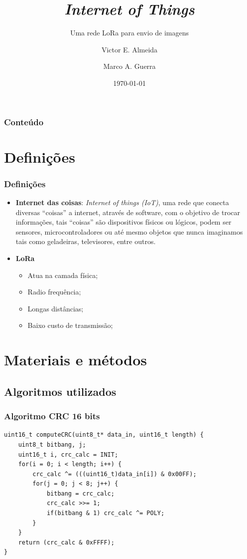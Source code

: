 \documentclass[12pt]{beamer}
\author{Victor E. Almeida \and Marco A. Guerra}
\title{\textit{Internet of Things}}
\subtitle{Uma rede LoRa para envio de imagens}
\date{\today}
\institute{UNIOESTE}
\begin{document}
\frame{\titlepage}

\begin{frame}
\frametitle{Conteúdo}
\tableofcontents
\end{frame}

\section{Definições}
\begin{frame}[allowframebreaks]
    \frametitle{Definições}
    \begin{itemize}
        \item\textbf{Internet das coisas}: \textit{Internet of things (IoT)}, uma rede que conecta
		diversas ``coisas'' a internet, através de software, com o objetivo de trocar informações,
		tais ``coisas'' são dispositivos físicos ou lógicos, podem ser sensores, microcontroladores ou até mesmo objetos que nunca
		imaginamos tais como geladeiras, televisores, entre outros.
        \framebreak
        \item\textbf{LoRa}
            \begin{itemize}
                \item Atua na camada física;
                \item Radio frequência;
                \item Longas distâncias;
                \item Baixo custo de transmissão;
            \end{itemize}
    \end{itemize}
\end{frame}

\section{Materiais e métodos}
\subsection{Algoritmos utilizados}

\begin{frame}[t,fragile]
    \frametitle{Algoritmo CRC 16 bits}
\begin{lstlisting}[basicstyle=\small]
uint16_t computeCRC(uint8_t* data_in, uint16_t length) {
    uint8_t bitbang, j;
    uint16_t i, crc_calc = INIT;
    for(i = 0; i < length; i++) {
        crc_calc ^= (((uint16_t)data_in[i]) & 0x00FF);
        for(j = 0; j < 8; j++) {
            bitbang = crc_calc;
            crc_calc >>= 1;
            if(bitbang & 1) crc_calc ^= POLY;
        }
    }
    return (crc_calc & 0xFFFF);
}
\end{lstlisting}
\end{frame}
\end{document}
